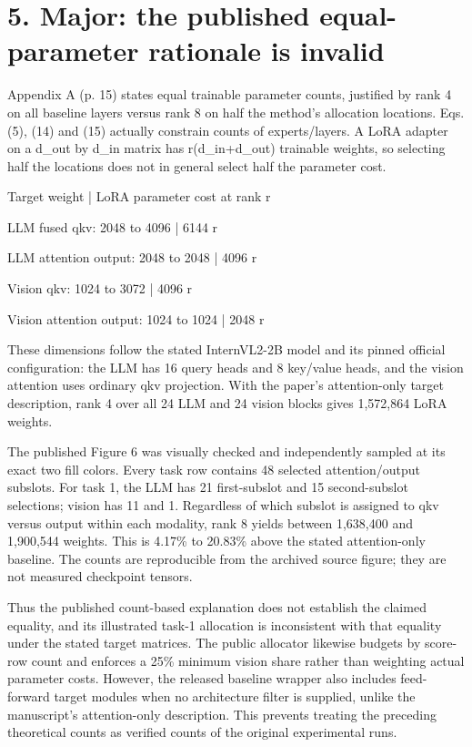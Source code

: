 \documentclass[10pt]{article}
\begin{document}
\section*{5. Major: the published equal-parameter rationale is invalid}
Appendix A (p. 15) states equal trainable parameter counts, justified by rank 4 on all baseline layers versus rank 8 on half the method’s allocation locations. Eqs. (5), (14) and (15) actually constrain counts of experts/layers. A LoRA adapter on a d\_out by d\_in matrix has r(d\_in+d\_out) trainable weights, so selecting half the locations does not in general select half the parameter cost.\par
Target weight | LoRA parameter cost at rank r\par
LLM fused qkv: 2048 to 4096 | 6144 r\par
LLM attention output: 2048 to 2048 | 4096 r\par
Vision qkv: 1024 to 3072 | 4096 r\par
Vision attention output: 1024 to 1024 | 2048 r\par
These dimensions follow the stated InternVL2-2B model and its pinned official configuration: the LLM has 16 query heads and 8 key/value heads, and the vision attention uses ordinary qkv projection. With the paper’s attention-only target description, rank 4 over all 24 LLM and 24 vision blocks gives 1,572,864 LoRA weights.\par
The published Figure 6 was visually checked and independently sampled at its exact two fill colors. Every task row contains 48 selected attention/output subslots. For task 1, the LLM has 21 first-subslot and 15 second-subslot selections; vision has 11 and 1. Regardless of which subslot is assigned to qkv versus output within each modality, rank 8 yields between 1,638,400 and 1,900,544 weights. This is 4.17\% to 20.83\% above the stated attention-only baseline. The counts are reproducible from the archived source figure; they are not measured checkpoint tensors.\par
Thus the published count-based explanation does not establish the claimed equality, and its illustrated task-1 allocation is inconsistent with that equality under the stated target matrices. The public allocator likewise budgets by score-row count and enforces a 25\% minimum vision share rather than weighting actual parameter costs. However, the released baseline wrapper also includes feed-forward target modules when no architecture filter is supplied, unlike the manuscript’s attention-only description. This prevents treating the preceding theoretical counts as verified counts of the original experimental runs.\par
\end{document}
